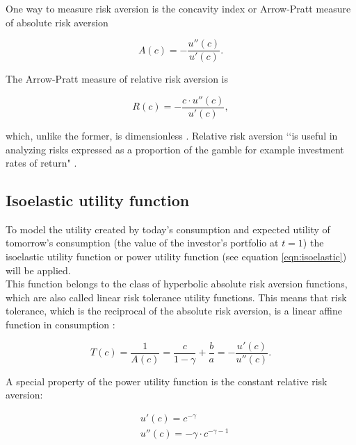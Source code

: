 \noindent One way to measure risk aversion is the concavity index or Arrow-Pratt measure of absolute risk aversion \citep[p. 1339]{wakker2008crra}

\begin{equation}
    A(c) = - \dfrac{u''(c)}{u'(c)}.
\end{equation}

\bigskip

\noindent The Arrow-Pratt measure of relative risk aversion is

\begin{equation}
    R(c) = - \dfrac{c \cdot u''(c)}{u'(c)},
\end{equation}

\bigskip

\noindent which, unlike the former, is dimensionless \citep[p. 363]{simon1994mathematics}. Relative risk aversion \lq\lq is useful in analyzing risks expressed as a proportion of the gamble for example investment rates of return" \citep[p. 39]{ingersoll1987theory}.

\bigskip



\subsection{Isoelastic utility function}

\noindent To model the utility created by today's consumption and expected utility of tomorrow's consumption (the value of the investor's portfolio at $t=1$) the isoelastic utility function or power utility function (see equation \ref{eqn:isoelastic}) will be applied. \\
This function belongs to the class of hyperbolic absolute risk aversion functions, which are also called linear risk tolerance utility functions. This means that risk tolerance, which is the reciprocal of the absolute risk aversion, is a linear affine function in consumption \citep[p. 39]{ingersoll1987theory}:

\begin{equation}
    T(c) = \dfrac{1}{A(c)} = \dfrac{c}{1-\gamma} + \dfrac{b}{a} = - \dfrac{u'(c)}{u''(c)}.
\end{equation}

\bigskip

\noindent A special property of the power utility function is the constant relative risk aversion:

\begin{equation}
    \begin{split}
        & u'(c) = c^{-\gamma} \\
        & u''(c) = -\gamma \cdot c^{-\gamma -1}
    \end{split}
\end{equation}

